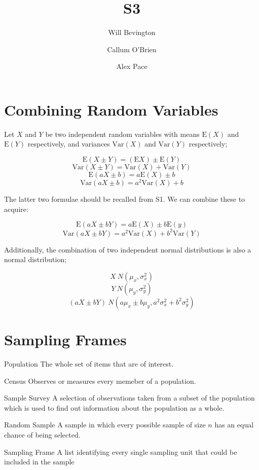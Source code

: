 \documentclass{article}
\begin{document}
\title{S3} \author{Will Bevington \and Callum O'Brien \and Alex Pace} \maketitle
\tableofcontents

\newpage

\section{Combining Random Variables}

Let $X$ and $Y$ be two independent random variables with means $\textrm{E}(X)$
and $\textrm{E}(Y)$ respectively, and variances $\textrm{Var}(X)$ and
$\textrm{Var}(Y)$ respectively;

\[\textrm{E}(X\pm Y)=(\textrm{E}X)\pm\textrm{E}(Y)\] \[\textrm{Var}(X\pm
Y)=\textrm{Var}(X)+\textrm{Var}(Y)\] \[\textrm{E}(aX\pm b)=a\textrm{E}(X)\pm b\]
\[\textrm{Var}(aX\pm b)=a^2\textrm{Var}(X)+b\]

\noindent The latter two formulae should be recalled from S1. We can combine
these to acquire:

\[\textrm{E}(aX\pm bY) = a\textrm{E}(X)\pm b\textrm{E}(y)\] \[\textrm{Var}(aX\pm
bY) = a^2\textrm{Var}(X)+b^2\textrm{Var}(Y)\]

\noindent Additionally, the combination of two independent normal distributions
is also a normal distribution;

\[X~N(\mu_x,\sigma_x^2)\] \[Y~N(\mu_y,\sigma_y^2)\] \[(aX\pm bY)~N(a\mu_x\pm
b\mu_y,a^2\sigma_x^2+b^2\sigma_y^2)\]

\section{Sampling Frames}

\begin{description}
    
    \item{Population} The whole set of items that are of interest.
    \item{Census} Observes or measures every memeber of a population.
    \item{Sample Survey} A selection of observations taken from a subset of the
        population which is used to find out information about the population as
        a whole.
    \item{Random Sample} A sample in which every possible sample of size $n$ has
        an equal chance of being selected.  
    \item{Sampling Frame} A list identifying every single sampling unit that
        could be included in the sample

\end{description}
\end{document}
